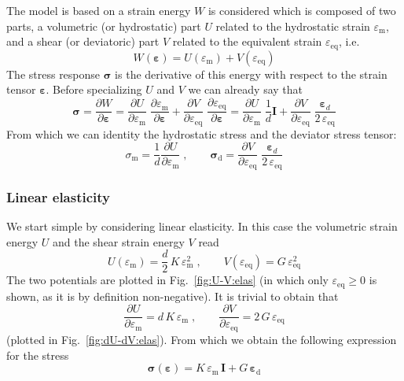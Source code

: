 \documentclass[times,namecite]{goose-article}
\begin{document}
The model is based on a strain energy $W$ is considered which is composed of two parts, a volumetric (or hydrostatic) part $U$ related to the hydrostatic strain $\varepsilon_\mathrm{m}$, and a shear (or deviatoric) part $V$ related to the equivalent strain $\varepsilon_\mathrm{eq}$, i.e.\
\begin{equation}
  W ( \bm{\varepsilon} ) = U ( \varepsilon_\mathrm{m} ) + V ( \varepsilon_\mathrm{eq} )
\end{equation}
The stress response $\bm{\sigma}$ is the derivative of this energy with respect to the strain tensor $\bm{\varepsilon}$. Before specializing $U$ and $V$ we can already say that
\begin{equation}\label{eq:dU-dV:elas}
  \bm{\sigma}
  =
  \frac{\partial W}{\partial \bm{\varepsilon}}
  =
  \frac{\partial U}{\partial \varepsilon_\mathrm{m}} \;
  \frac{\partial \varepsilon_\mathrm{m}}{\partial \bm{\varepsilon}}
  +
  \frac{\partial V}{\partial \varepsilon_\mathrm{eq}} \;
  \frac{\partial \varepsilon_\mathrm{eq}}{\partial \bm{\varepsilon}}
  =
  \frac{\partial U}{\partial \varepsilon_\mathrm{m}} \;
  \frac{1}{d} \bm{I}
  +
  \frac{\partial V}{\partial \varepsilon_\mathrm{eq}} \;
  \frac{\bm{\varepsilon}_d}{2 \, \varepsilon_\mathrm{eq}}
\end{equation}
From which we can identity the hydrostatic stress and the deviator stress tensor:
\begin{equation}\label{stress:generic}
  \sigma_\mathrm{m} = \frac{1}{d} \frac{\partial U}{\partial \varepsilon_\mathrm{m}}
  \;, \qquad
  \bm{\sigma}_\mathrm{d}
  =
  \frac{\partial V}{\partial \varepsilon_\mathrm{eq}} \;
  \frac{\bm{\varepsilon}_d}{2 \, \varepsilon_\mathrm{eq}}
\end{equation}

\subsubsection{Linear elasticity}

We start simple by considering linear elasticity. In this case the volumetric strain energy $U$ and the shear strain energy $V$ read
\begin{equation}\label{eq:W:elas}
  U ( \varepsilon_\mathrm{m}  ) = \frac{d}{2} \, K \, \varepsilon_\mathrm{m}^2
  \;, \qquad
  V ( \varepsilon_\mathrm{eq} ) = G \, \varepsilon_\mathrm{eq}^2
\end{equation}
The two potentials are plotted in Fig.~\ref{fig:U-V:elas} (in which only $\varepsilon_\mathrm{eq} \geq 0$ is shown, as it is by definition non-negative). It is trivial to obtain that
\begin{equation}
  \frac{\partial U}{\partial \varepsilon_\mathrm{m}}
  =
  d \, K \, \varepsilon_\mathrm{m}
  \;, \qquad
  \frac{\partial V}{\partial \varepsilon_\mathrm{eq}}
  =
  2 \, G \, \varepsilon_\mathrm{eq}
\end{equation}
(plotted in Fig.~\ref{fig:dU-dV:elas}). From which we obtain the following expression for the stress
\begin{equation}\label{eq:sig-elas}
  \bm{\sigma} ( \bm{\varepsilon} )
  =
  K \, \varepsilon_\mathrm{m} \, \bm{I}
  +
  G \, \bm{\varepsilon}_\mathrm{d}
\end{equation}
\end{document}
